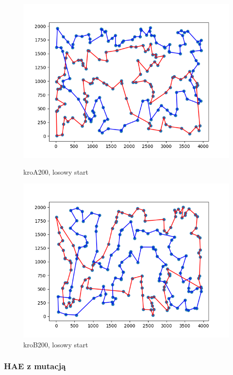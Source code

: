 \documentclass[11pt]{article}
\begin{document}
\begin{figure}[H]
    \begin{minipage}[t]{0.45\textwidth}
        \centering
        \includegraphics[width=\linewidth]{best_paths/kroA200/HAE}
        \caption{kroA200, losowy start}
    \end{minipage}
    \hfill
    \begin{minipage}[t]{0.45\textwidth}
        \centering
        \includegraphics[width=\linewidth]{best_paths/kroB200/HAE}
        \caption{kroB200, losowy start}
    \end{minipage}\label{fig:figure5}
\end{figure}

\subsubsection{HAE z mutacją}
\end{document}
